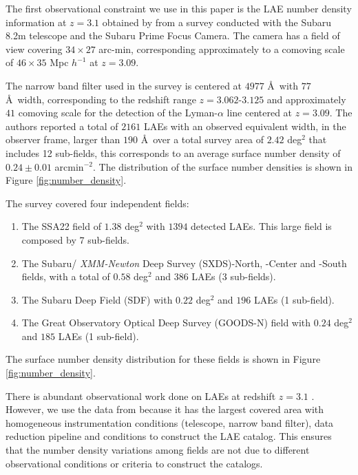 \documentclass{emulateapj}
\newcommand{\hMpc}{{\ifmmode{h^{-1}{\rm Mpc}}\else{$h^{-1}$Mpc }\fi}}
\begin{document}
The first observational constraint we use in this paper is the LAE number
density information at $z=3.1$ obtained by \cite{Yamada2012} from a survey
conducted with the Subaru 8.2m telescope and the Subaru Prime Focus Camera.
The camera has a field of view covering $34\times 27$ arc-min,
corresponding approximately to a comoving scale of $46\times35$ Mpc
$h^{-1}$ at $z=3.09$.  

The narrow band filter used in the survey is
centered at $4977$ \AA~with  $77$ \AA~width, corresponding to the
redshift range $z=3.062$-$3.125$ and approximately $41$ \hMpc comoving scale for the
detection of the Lyman-$\alpha$ line centered at
$z=3.09$. The authors reported a total of $2161$  LAEs with an
observed equivalent width, in the observer frame, larger than $190$
\AA~over a total survey area of $2.42$ deg$^{2}$ that includes 12
sub-fields,  this corresponds to an average surface number density of
$0.24\pm 0.01$ arcmin$^{-2}$.  The distribution of the surface number
densities is shown in Figure \ref{fig:number_density}.  

The survey covered four independent fields:

\begin{enumerate}
\item The SSA22
field of $1.38$ deg$^2$ with $1394$ detected LAEs. This large field is
composed by 7 sub-fields. 

\item The Subaru/{\it
  XMM-Newton} Deep Survey (SXDS)-North, -Center and -South fields, with a
total of $0.58$ deg$^2$ and $386$ LAEs (3 sub-fields).

\item The Subaru Deep Field (SDF) with $0.22$ deg$^2$ and
$196$ LAEs (1 sub-field).

\item The Great Observatory Optical Deep Survey  (GOODS-N) field with
  $0.24$ deg$^2$ and $185$ LAEs (1 sub-field).   
\end{enumerate}

The surface number density distribution for these fields is shown in
Figure \ref{fig:number_density}.

There is abundant observational work done on LAEs at redshift $z=3.1$
\citep{Kudritzki2000,Matsuda2005,Gawiser2007,Nilsson2007,Ouchi2008}.
However, we use the data from \cite{Yamada2012} because
it has the largest covered area with homogeneous instrumentation
conditions (telescope, narrow band filter), data reduction pipeline
and conditions to construct the LAE catalog. This ensures that the
number density variations among fields are not due to different
observational conditions or criteria to construct the catalogs.
\end{document}
